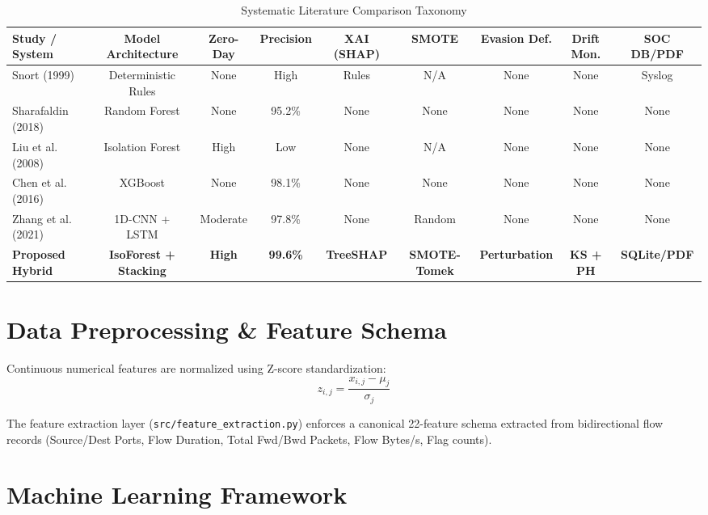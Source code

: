 \documentclass[conference]{IEEEtran}
\begin{document}
\begin{table}[t]
\centering
\caption{Systematic Literature Comparison Taxonomy}
\label{tab:taxonomy}
\begin{tabular}{lcccccccc}
\toprule
\textbf{Study / System} & \textbf{Model Architecture} & \textbf{Zero-Day} & \textbf{Precision} & \textbf{XAI (SHAP)} & \textbf{SMOTE} & \textbf{Evasion Def.} & \textbf{Drift Mon.} & \textbf{SOC DB/PDF} \\
\midrule
Snort (1999) \cite{snort} & Deterministic Rules & None & High & Rules & N/A & None & None & Syslog \\
Sharafaldin (2018) \cite{sharafaldin2018generating} & Random Forest & None & 95.2\% & None & None & None & None & None \\
Liu et al. (2008) \cite{liu2008isolation} & Isolation Forest & High & Low & None & N/A & None & None & None \\
Chen et al. (2016) \cite{chen2016xgboost} & XGBoost & None & 98.1\% & None & None & None & None & None \\
Zhang et al. (2021) \cite{zhang2021deep} & 1D-CNN + LSTM & Moderate & 97.8\% & None & Random & None & None & None \\
\textbf{Proposed Hybrid} & \textbf{IsoForest + Stacking} & \textbf{High} & \textbf{99.6\%} & \textbf{TreeSHAP} & \textbf{SMOTE-Tomek} & \textbf{Perturbation} & \textbf{KS + PH} & \textbf{SQLite/PDF} \\
\bottomrule
\end{tabular}
\end{table}

\section{Data Preprocessing \& Feature Schema}
Continuous numerical features are normalized using Z-score standardization:
\begin{equation}
z_{i,j} = \frac{x_{i,j} - \mu_j}{\sigma_j}
\end{equation}

The feature extraction layer (\texttt{src/feature\_extraction.py}) enforces a canonical 22-feature schema extracted from bidirectional flow records (Source/Dest Ports, Flow Duration, Total Fwd/Bwd Packets, Flow Bytes/s, Flag counts).

\section{Machine Learning Framework}
\end{document}
